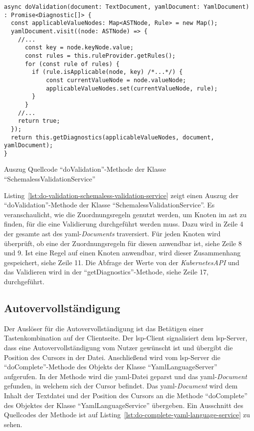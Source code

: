 \begin{listing}[htp]
  \begin{verbatim}
async doValidation(document: TextDocument, yamlDocument: YamlDocument)
: Promise<Diagnostic[]> {
  const applicableValueNodes: Map<ASTNode, Rule> = new Map();
  yamlDocument.visit((node: ASTNode) => {
    //...
      const key = node.keyNode.value;
      const rules = this.ruleProvider.getRules();
      for (const rule of rules) {
        if (rule.isApplicable(node, key) /*...*/) {
            const currentValueNode = node.valueNode;
            applicableValueNodes.set(currentValueNode, rule);
        }
      }
    //...
    return true;
  });
  return this.getDiagnostics(applicableValueNodes, document, yamlDocument);
}
      \end{verbatim}
  \caption{Auszug Quellcode ``doValidation''-Methode der Klasse ``SchemalessValidationService''}
  \label{lst:do-validation-schemaless-validation-service}
\end{listing}

Listing~\ref{lst:do-validation-schemaless-validation-service} zeigt einen Auszug der ``doValidation''-Methode der Klasse ``SchemalessValidationService''.
Es veranschaulicht, wie die Zuordnungsregeln genutzt werden, um Knoten im \ac{ast} zu finden, für die eine Validierung durchgeführt
werden muss. Dazu wird in Zeile 4 der gesamte \ac{ast} des \ac{yaml}-\textit{Documents} traversiert. Für
jeden Knoten wird überprüft, ob eine der Zuordnungsregeln für diesen anwendbar ist, siehe Zeile 8 und 9.
Ist eine Regel auf einen Knoten anwendbar, wird dieser Zusammenhang gespeichert, siehe Zeile 11. Die Abfrage der Werte von der \textit{KubernetesAPI} und
das Validieren wird in der ``getDiagnostics''-Methode, siehe Zeile 17, durchgeführt.

\subsection{Autovervollständigung}

Der Auslöser für die Autovervollständigung ist das Betätigen einer Tastenkombination auf der Clientseite. Der \ac{lsp}-Client signalisiert dem \ac{lsp}-Server,
dass eine Autovervollständigung vom Nutzer gewünscht ist und übergibt die Position des Cursors in der Datei.
Anschließend wird vom \ac{lsp}-Server die ``doComplete''-Methode des Objekts der Klasse ``YamlLanguageServer'' aufgerufen.
In der Methode wird die \ac{yaml}-Datei geparst und das \ac{yaml}-\textit{Document} gefunden, in welchem sich der Cursor befindet.
Das \ac{yaml}-\textit{Document} wird dem Inhalt der Textdatei und der Position des Cursors an die Methode ``doComplete'' des Objektes der Klasse ``YamlLanguageService'' übergeben.
Ein Ausschnitt des Quellcodes der Methode ist auf Listing~\ref{lst:do-complete-yaml-language-service} zu sehen.

